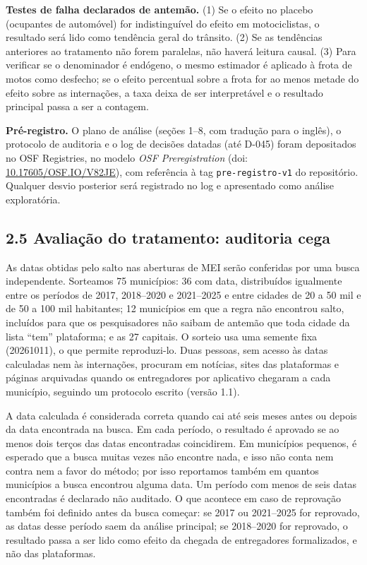 \documentclass[
  11pt,
]{article}
\begin{document}
\textbf{Testes de falha declarados de antemão.} (1) Se o efeito no placebo (ocupantes de automóvel) for indistinguível do efeito em motociclistas, o resultado será lido como tendência geral do trânsito. (2) Se as tendências anteriores ao tratamento não forem paralelas, não haverá leitura causal. (3) Para verificar se o denominador é endógeno, o mesmo estimador é aplicado à frota de motos como desfecho; se o efeito percentual sobre a frota for ao menos metade do efeito sobre as internações, a taxa deixa de ser interpretável e o resultado principal passa a ser a contagem.

\textbf{Pré-registro.} O plano de análise (seções 1--8, com tradução para o inglês), o protocolo de auditoria e o log de decisões datadas (até D-045) foram depositados no OSF Registries, no modelo \emph{OSF Preregistration} (doi: \href{https://doi.org/10.17605/OSF.IO/V82JE}{10.17605/OSF.IO/V82JE}), com referência à tag \texttt{pre-registro-v1} do repositório. Qualquer desvio posterior será registrado no log e apresentado como análise exploratória.

\hypertarget{avaliauxe7uxe3o-do-tratamento-auditoria-cega}{%
\subsection{2.5 Avaliação do tratamento: auditoria cega}\label{avaliauxe7uxe3o-do-tratamento-auditoria-cega}}

As datas obtidas pelo salto nas aberturas de MEI serão conferidas por uma busca independente. Sorteamos 75 municípios: 36 com data, distribuídos igualmente entre os períodos de 2017, 2018--2020 e 2021--2025 e entre cidades de 20 a 50 mil e de 50 a 100 mil habitantes; 12 municípios em que a regra não encontrou salto, incluídos para que os pesquisadores não saibam de antemão que toda cidade da lista ``tem'' plataforma; e as 27 capitais. O sorteio usa uma semente fixa (20261011), o que permite reproduzi-lo. Duas pessoas, sem acesso às datas calculadas nem às internações, procuram em notícias, sites das plataformas e páginas arquivadas quando os entregadores por aplicativo chegaram a cada município, seguindo um protocolo escrito (versão 1.1).

A data calculada é considerada correta quando cai até seis meses antes ou depois da data encontrada na busca. Em cada período, o resultado é aprovado se ao menos dois terços das datas encontradas coincidirem. Em municípios pequenos, é esperado que a busca muitas vezes não encontre nada, e isso não conta nem contra nem a favor do método; por isso reportamos também em quantos municípios a busca encontrou alguma data. Um período com menos de seis datas encontradas é declarado não auditado. O que acontece em caso de reprovação também foi definido antes da busca começar: se 2017 ou 2021--2025 for reprovado, as datas desse período saem da análise principal; se 2018--2020 for reprovado, o resultado passa a ser lido como efeito da chegada de entregadores formalizados, e não das plataformas.
\end{document}
